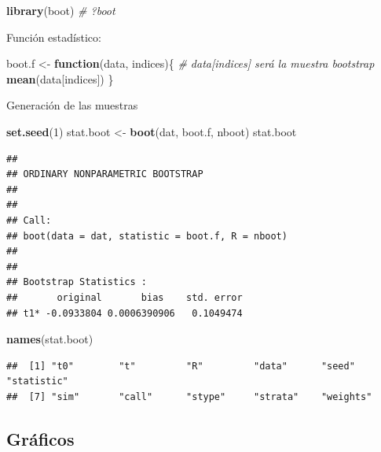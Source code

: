\documentclass[
]{book}
\newenvironment{Shaded}{\begin{snugshade}}{\end{snugshade}}
\newcommand{\CommentTok}[1]{\textcolor[rgb]{0.56,0.35,0.01}{\textit{#1}}}
\newcommand{\ControlFlowTok}[1]{\textcolor[rgb]{0.13,0.29,0.53}{\textbf{#1}}}
\newcommand{\DecValTok}[1]{\textcolor[rgb]{0.00,0.00,0.81}{#1}}
\newcommand{\KeywordTok}[1]{\textcolor[rgb]{0.13,0.29,0.53}{\textbf{#1}}}
\newcommand{\NormalTok}[1]{#1}
\newcommand{\StringTok}[1]{\textcolor[rgb]{0.31,0.60,0.02}{#1}}
\theoremstyle{break}
\theoremstyle{definition}
\theoremstyle{definition}
\theoremstyle{definition}
\theoremstyle{remark}
\begin{document}
\begin{Shaded}
\begin{Highlighting}[]
\KeywordTok{library}\NormalTok{(boot)}
\CommentTok{# ?boot}
\end{Highlighting}
\end{Shaded}

Función estadístico:

\begin{Shaded}
\begin{Highlighting}[]
\NormalTok{boot.f <-}\StringTok{ }\ControlFlowTok{function}\NormalTok{(data, indices)\{}
  \CommentTok{# data[indices] será la muestra bootstrap}
  \KeywordTok{mean}\NormalTok{(data[indices])}
\NormalTok{\}}
\end{Highlighting}
\end{Shaded}

Generación de las muestras

\begin{Shaded}
\begin{Highlighting}[]
\KeywordTok{set.seed}\NormalTok{(}\DecValTok{1}\NormalTok{)}
\NormalTok{stat.boot <-}\StringTok{ }\KeywordTok{boot}\NormalTok{(dat, boot.f, nboot)}
\NormalTok{stat.boot}
\end{Highlighting}
\end{Shaded}

\begin{verbatim}
## 
## ORDINARY NONPARAMETRIC BOOTSTRAP
## 
## 
## Call:
## boot(data = dat, statistic = boot.f, R = nboot)
## 
## 
## Bootstrap Statistics :
##       original       bias    std. error
## t1* -0.0933804 0.0006390906   0.1049474
\end{verbatim}

\begin{Shaded}
\begin{Highlighting}[]
\KeywordTok{names}\NormalTok{(stat.boot)}
\end{Highlighting}
\end{Shaded}

\begin{verbatim}
##  [1] "t0"        "t"         "R"         "data"      "seed"      "statistic"
##  [7] "sim"       "call"      "stype"     "strata"    "weights"
\end{verbatim}

\hypertarget{gruxe1ficos}{%
\subsection{Gráficos}\label{gruxe1ficos}}
\end{document}
